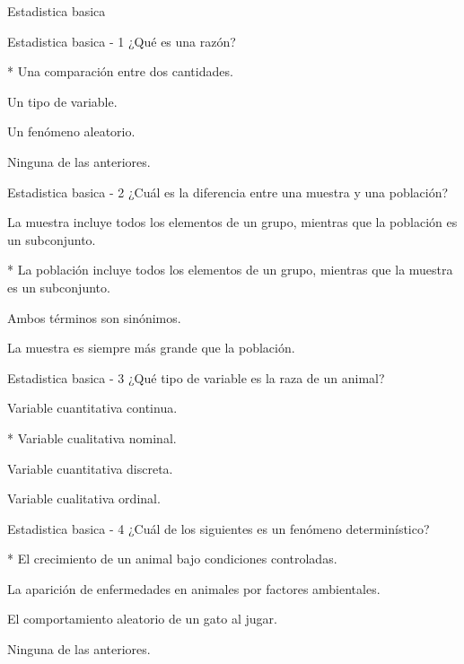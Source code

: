 \documentclass[a4,11pt]{aleph-notas}
\begin{document}
\begin{quiz}{Estadistica basica}

\begin{multi}%
    {Estadistica basica - 1}
    ¿Qué es una razón?
    \item[]* Una comparación entre dos cantidades.
    \item[] Un tipo de variable.
    \item[] Un fenómeno aleatorio.
    \item[] Ninguna de las anteriores.
\end{multi}

\begin{multi}%
    {Estadistica basica - 2}
    ¿Cuál es la diferencia entre una muestra y una población?
    \item[] La muestra incluye todos los elementos de un grupo, mientras que la población es un subconjunto.
    \item[]* La población incluye todos los elementos de un grupo, mientras que la muestra es un subconjunto.
    \item[] Ambos términos son sinónimos.
    \item[] La muestra es siempre más grande que la población.
\end{multi}

\begin{multi}%
    {Estadistica basica - 3}
    ¿Qué tipo de variable es la raza de un animal?
    \item[] Variable cuantitativa continua.
    \item[]* Variable cualitativa nominal.
    \item[] Variable cuantitativa discreta.
    \item[] Variable cualitativa ordinal.
\end{multi}

\begin{multi}%
    {Estadistica basica - 4}
    ¿Cuál de los siguientes es un fenómeno determinístico?
    \item[]* El crecimiento de un animal bajo condiciones controladas.
    \item[] La aparición de enfermedades en animales por factores ambientales.
    \item[] El comportamiento aleatorio de un gato al jugar.
    \item[] Ninguna de las anteriores.
\end{multi}


\end{quiz}
\end{document}
